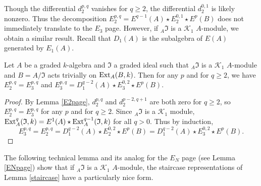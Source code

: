 \documentclass[11pt,righttag]{amsart}
\begin{document}
Though the differential $d_2^{p,q}$ vanishes for $q\ge 2$, the differential $d_2^{0,1}$ is likely nonzero. Thus the decomposition $E_2^{p,q}=E^{q-1}(A)\star E_2^{0,1}\star E^p(B)$ does not immediately translate to the $E_3$ page. However, if $_A{\mathfrak{I}}$ is a ${{\mathcal K}}_1$ $A$-module, we obtain a similar result. Recall that $D_1(A)$ is the subalgebra of $E(A)$ generated by $E_1(A)$.

\begin{lemma}
\label{E2=E3} 
Let $A$ be a graded $k$-algebra and  ${\mathfrak{I}}$ a graded ideal such that $_A{\mathfrak{I}}$ is a ${{\mathcal K}}_1$ $A$-module and $B=A/{\mathfrak{I}}$ acts trivially on ${\hbox{{\rm Ext}}}_A(B,k)$. Then for any $p$ and for $q\ge 2$, we have $E_2^{p,q}= E_3^{p,q}$ and $E_3^{p,q}=D_1^{q-2}(A)\star E_3^{0,2}\star E^p(B)$.
\end{lemma}

\begin{proof}
By Lemma \ref{E2page}, $d_2^{p,q}$ and $d_2^{p-2,q+1}$ are both zero for $q\ge 2$, so $E_2^{p,q}=E_3^{p,q}$ for any $p$ and for $q\ge 2$. Since $_A{\mathfrak{I}}$ is a ${{\mathcal K}}_1$ module, ${\hbox{{\rm Ext}}}_A^q({\mathfrak{I}},k)=E^1(A)\star{\hbox{{\rm Ext}}}_A^{q-1}({\mathfrak{I}},k)$ for all $q>0$. Thus by induction, 
$$E_3^{p,q}=E_2^{p,q}=D_1^{q-2}(A)\star E_2^{0,2}\star E^p(B)=D_1^{q-2}(A)\star E_3^{0,2}\star E^p(B).$$
\end{proof}

The following technical lemma and its analog for the $E_N$ page (see Lemma \ref{ENpage}) show that if $_A{\mathfrak{I}}$ is a ${{\mathcal K}}_1$ $A$-module, the staircase representations of Lemma \ref{staircase} have a particularly nice form.
\end{document}
